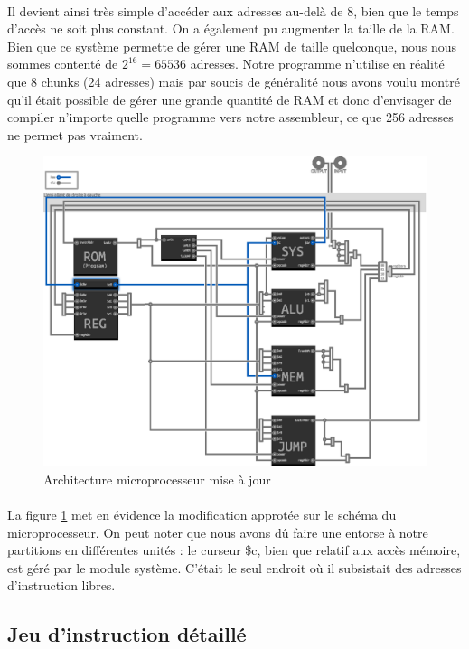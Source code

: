 \documentclass{article}
\begin{document}
\paragraph{}Il devient ainsi très simple d'accéder aux adresses au-delà de 8, bien que le temps d'accès ne soit plus constant. On a également pu augmenter la taille de la RAM. Bien que ce système permette de gérer une RAM de taille quelconque, nous nous sommes contenté de $2^16 = 65536$ adresses. Notre programme n'utilise en réalité que 8 chunks (24 adresses) mais par soucis de généralité nous avons voulu montré qu'il était possible de gérer une grande quantité de RAM et donc d'envisager de compiler n'importe quelle programme vers notre assembleur, ce que 256 adresses ne permet pas vraiment.

\begin{figure}[h]
\centering
\includegraphics{archi_update.eps}
\caption{\label{archi_update} Architecture microprocesseur mise à jour}
\end{figure}
\paragraph{}La figure \ref{archi_update} met en évidence la modification approtée sur le schéma du microprocesseur. On peut noter que nous avons dû faire une entorse à notre partitions en différentes unités : le curseur \$c, bien que relatif aux accès mémoire, est géré par le module système. C'était le seul endroit où il subsistait des adresses d'instruction libres.


\subsection{Jeu d'instruction détaillé}
\end{document}
